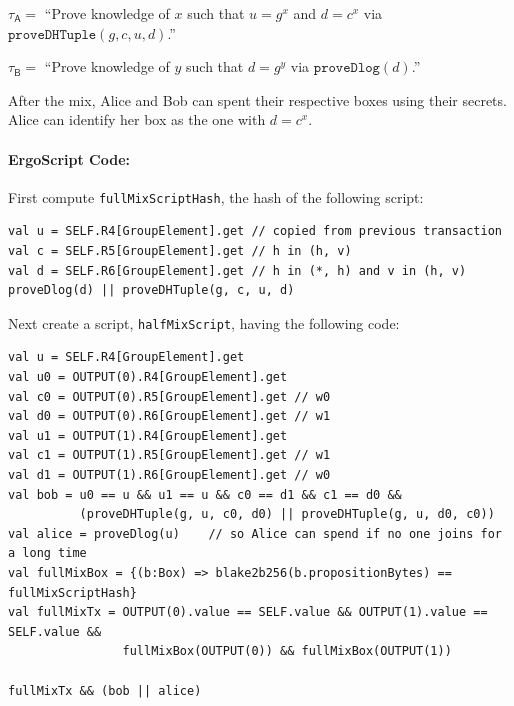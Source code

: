 \documentclass[11pt]{article}
\newcommand{\langname}{ErgoScript\xspace}
\newcommand{\mixname}{ErgoMix\xspace}
\begin{document}
\begin{enumerate}
\begin{enumerate}
		$\tau_\textsf{A} = $ ``Prove knowledge of $x$ such that $u = {g}^{x}$ and ${d} = {c}^{x}$ via $\texttt{proveDHTuple}(g, c, u, d)$.''
				
		$\tau_{\textsf{B}} = $ ``Prove knowledge of $y$ such that $d = {g}^{y}$ via $\texttt{proveDlog}(d)$.''
				
	\end{enumerate}

\end{enumerate}
	After the mix, Alice and Bob can spent their respective boxes using their secrets. 
	Alice can identify her box as the one with $d = c^x$. 

\paragraph{\langname Code:} First compute \texttt{fullMixScriptHash}, the hash of the following script:
\begin{verbatim}
val u = SELF.R4[GroupElement].get // copied from previous transaction
val c = SELF.R5[GroupElement].get // h in (h, v)
val d = SELF.R6[GroupElement].get // h in (*, h) and v in (h, v)
proveDlog(d) || proveDHTuple(g, c, u, d)
\end{verbatim}

Next create a script, \texttt{halfMixScript}, having the following code:
\begin{verbatim}
val u = SELF.R4[GroupElement].get
val u0 = OUTPUT(0).R4[GroupElement].get
val c0 = OUTPUT(0).R5[GroupElement].get // w0
val d0 = OUTPUT(0).R6[GroupElement].get // w1
val u1 = OUTPUT(1).R4[GroupElement].get 
val c1 = OUTPUT(1).R5[GroupElement].get // w1
val d1 = OUTPUT(1).R6[GroupElement].get // w0
val bob = u0 == u && u1 == u && c0 == d1 && c1 == d0 && 
          (proveDHTuple(g, u, c0, d0) || proveDHTuple(g, u, d0, c0))
val alice = proveDlog(u)    // so Alice can spend if no one joins for a long time
val fullMixBox = {(b:Box) => blake2b256(b.propositionBytes) == fullMixScriptHash}
val fullMixTx = OUTPUT(0).value == SELF.value && OUTPUT(1).value == SELF.value && 
                fullMixBox(OUTPUT(0)) && fullMixBox(OUTPUT(1))

fullMixTx && (bob || alice)
\end{verbatim}
\end{document}
